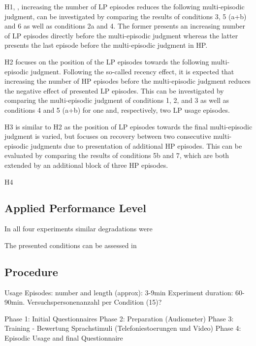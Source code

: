 H1, \ie, increasing the number of \ac{LP} episodes reduces the following multi-episodic judgment, can be investigated by comparing the results of conditions 3, 5 (a+b) and 6 as well as conditions 2a and 4.
The former presents an increasing number of \ac{LP} episodes directly before the multi-episodic judgment whereas the latter presents the last episode before the multi-episodic judgment in \ac{HP}.

H2 focuses on the position of the \ac{LP} episodes towards the following multi-episodic judgment.
Following the so-called recency effect, it is expected that increasing the number of \ac{HP} episodes before the multi-episodic judgment reduces the negative effect of presented \ac{LP} episodes.
This can be investigated by comparing the multi-episodic judgment of conditions 1, 2, and 3 as well as conditions 4 and 5 (a+b) for one and, respectively, two LP usage episodes.

H3 is similar to H2 as the position of \ac{LP} episodes towards the final multi-episodic judgment is varied, but focuses on recovery between two consecutive multi-episodic judgments due to presentation of additional \ac{HP} episodes.
This can be evaluated by comparing the results of conditions 5b and 7, which are both extended by an additional block of three \ac{HP} episodes.

H4 




\subsection{Applied Performance Level}
In all four experiments similar degradations were 

The presented conditions can be assessed in 


\subsection{Procedure} %

Usage Episodes: number and length (approx): 3-9min
Experiment duration: 60-90min.
Versuchspersonenanzahl per Condition (15)?

Phase 1: Initial Questionnaires
Phase 2: Preparation (Audiometer)
Phase 3: Training - Bewertung Sprachstimuli (Telefoniestoerungen und Video)
Phase 4: Episodic Usage and final Questionnaire

